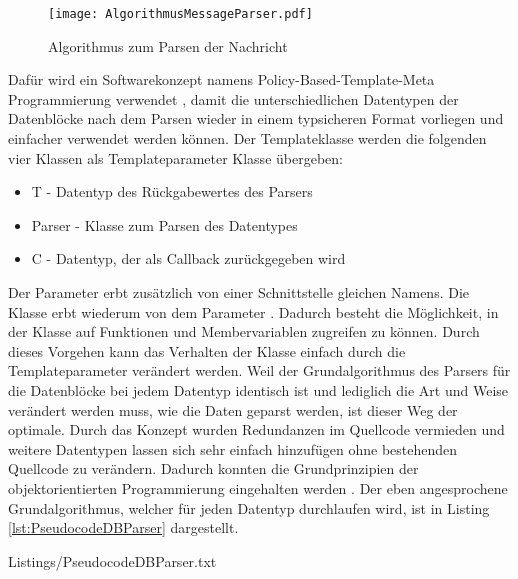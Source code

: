 \begin{figure}[H]
	\centering
	\texttt{[image: AlgorithmusMessageParser.pdf]}
	\caption{Algorithmus zum Parsen der Nachricht}
	\label{fig:AlgorithmusMessageParser}
\end{figure}

Daf{\"u}r wird ein Softwarekonzept namens Policy-Based-Template-Meta Programmierung
verwendet \cite{Alexandrescu:2001:MCD:377789}, damit die
unterschiedlichen Datentypen der Datenbl{\"o}cke nach dem Parsen wieder in einem
typsicheren Format vorliegen und einfacher verwendet werden k{\"o}nnen.
Der Templateklasse werden die folgenden vier Klassen als Templateparameter
Klasse {\"u}bergeben:

\begin{itemize}
	\item T - Datentyp des R{\"u}ckgabewertes des Parsers
	\item Parser - Klasse zum Parsen des Datentypes
	\item C - Datentyp, der als Callback zur{\"u}ckgegeben wird
\end{itemize}

Der Parameter  erbt zus{\"a}tzlich von einer
Schnittstelle gleichen Namens. Die Klasse  erbt
wiederum von dem Parameter .
Dadurch besteht die M{\"o}glichkeit, in der Klasse auf Funktionen und
Membervariablen zugreifen zu k{\"o}nnen.
Durch dieses Vorgehen kann das Verhalten der Klasse einfach durch die
Templateparameter ver{\"a}ndert werden. Weil der Grundalgorithmus des Parsers
f{\"u}r die Datenbl{\"o}cke bei jedem Datentyp identisch ist und lediglich die
Art und Weise ver{\"a}ndert werden muss, wie die Daten geparst werden,
ist dieser Weg der optimale. Durch das Konzept wurden
Redundanzen im Quellcode vermieden und weitere Datentypen lassen sich
sehr einfach hinzuf{\"u}gen ohne bestehenden Quellcode zu ver{\"a}ndern. Dadurch konnten
die Grundprinzipien der objektorientierten Programmierung eingehalten werden \cite{herold2001go}.
Der eben angesprochene Grundalgorithmus, welcher f{\"u}r jeden Datentyp
durchlaufen wird, ist in Listing \ref{lst:PseudocodeDBParser} dargestellt.

\lstset{language=pseudo}
\lstset{commentstyle=\textit}
{Listings/PseudocodeDBParser.txt}

